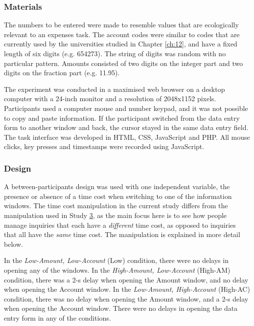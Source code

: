 \subsubsection{Materials}
The numbers to be entered were made to resemble values that are ecologically relevant to an expenses task. The account codes were similar to codes that are currently used by the universities studied in Chapter \ref{ch:12}, and have a fixed length of six digits (e.g. 654273). The string of digits was random with no particular pattern. Amounts consisted of two digits on the integer part and two digits on the fraction part (e.g. 11.95). 

The experiment was conducted in a maximised web browser on a desktop computer with a 24-inch monitor and a resolution of 2048x1152 pixels. Participants used a computer mouse and number keypad, and it was not possible to copy and paste information. If the participant switched from the data entry form to another window and back, the cursor stayed in the same data entry field. The task interface was developed in HTML, CSS, JavaScript and PHP. All mouse clicks, key presses and timestamps were recorded using JavaScript.

\subsubsection{Design}
A between-participants design was used with one independent variable, the presence or absence of a time cost when switching to one of the information windows. The time cost manipulation in the current study differs from the manipulation used in Study \hyperref[st:Study3]{3}, as the main focus here is to see how people manage inquiries that each have a \textit{different} time cost, as opposed to inquiries that all have the \textit{same} time cost. The manipulation is explained in more detail below. 

In the \textit{Low-Amount, Low-Account} (Low) condition, there were no delays in opening any of the windows. In the \textit{High-Amount, Low-Account} (High-AM) condition, there was a 2-s delay when opening the Amount window, and no delay when opening the Account window. In the \textit{Low-Amount, High-Account} (High-AC) condition, there was no delay when opening the Amount window, and a 2-s delay when opening the Account window. There were no delays in opening the data entry form in any of the conditions.

